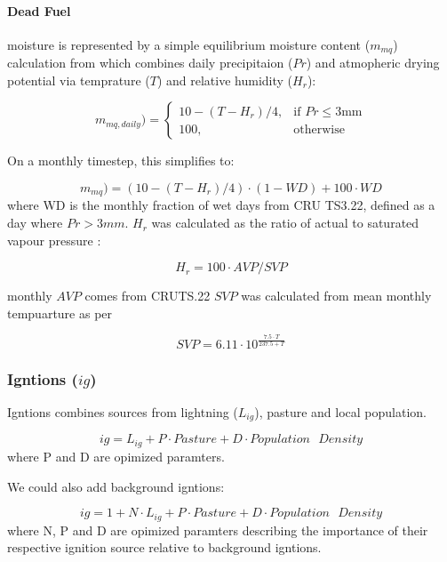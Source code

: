 \paragraph{Dead Fuel} moisture is represented by a simple equilibrium moisture content ($m_{mq}$) calculation from \citep{viney1991review} which combines daily precipitaion ($Pr$) and atmopheric drying potential via temprature ($T$) and relative humidity ($H_r$):

\begin{equation}
     m_{mq, daily})=
        \begin{cases}
            10 - (T - H_r) / 4 ,& \text{if } Pr\leq 3 \text{mm}\\
            100,              & \text{otherwise}
        \end{cases}
\end{equation}

On a monthly timestep, this simplifies to:

\begin{equation}
     m_{mq})=
        (10 - (T - H_r) / 4) \cdot (1 - WD)
        + 100 \cdot WD
\end{equation}
where WD is the monthly fraction of wet days from CRU TS3.22, defined as a day where $Pr > 3mm$. $H_r$ was calculated as the ratio of actual to saturated vapour pressure :

\begin{equation}
    H_r = 100 \cdot AVP / SVP
\end{equation}

monthly $AVP$ comes from CRUTS.22 $SVP$ was calculated from mean monthly tempuarture as per \citet{walter2000asce}

\begin{equation}
    SVP = 6.11 \cdot 10^{\frac{7.5 \cdot T}{237.5 + T}}
\end{equation}

\subsubsection{Igntions ($ig$)}

Igntions combines sources from lightning ($L_{ig}$), pasture and local population.

\begin{equation}
    ig = L_{ig} + P \cdot Pasture + D \cdot Population\text{ }Density
\end{equation}
where P and D are opimized paramters.

\begin{shaded}
    We could also add background igntions:

    \begin{equation}
        ig = 1 + N \cdot L_{ig} + P \cdot Pasture + D \cdot Population\text{ }Density
    \end{equation}
    where N, P and D are opimized paramters describing the importance of their respective ignition source relative to background igntions.
\end{shaded}

